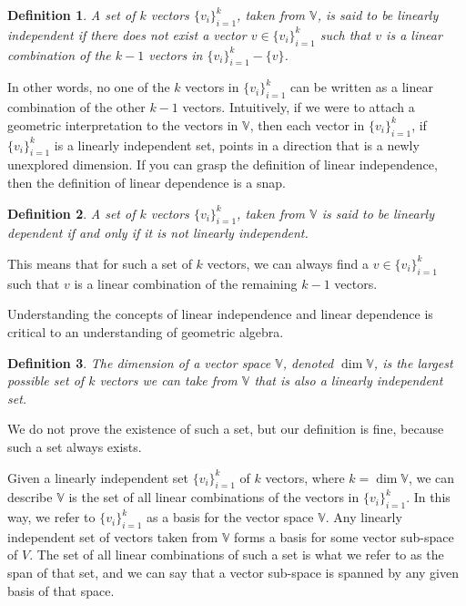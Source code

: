 \documentclass[12pt]{article}
\newcommand{\V}{\mathbb{V}}
\newtheorem{definition}{Definition}[section]
\begin{document}
\begin{definition}
A set of $k$ vectors $\{v_i\}_{i=1}^k$, taken from $\V$, is said to be linearly
independent if there does not exist a vector $v\in\{v_i\}_{i=1}^k$ such that
$v$ is a linear combination of the $k-1$ vectors in $\{v_i\}_{i=1}^k-\{v\}$.
\end{definition}

In other words, no one of the $k$ vectors in $\{v_i\}_{i=1}^k$ can be
written as a linear combination of the other $k-1$ vectors.  Intuitively, if
we were to attach a geometric interpretation to the vectors in $\V$, then
each vector in $\{v_i\}_{i=1}^k$, if $\{v_i\}_{i=1}^k$ is a linearly independent set, points
in a direction that is a newly unexplored dimension.  If you can grasp the
definition of linear independence, then the definition of linear dependence
is a snap.

\begin{definition}
A set of $k$ vectors $\{v_i\}_{i=1}^k$, taken from $\V$ is said to be linearly
dependent if and only if it is not linearly independent.
\end{definition}

This means that for such a set of $k$ vectors, we can always find a $v\in\{v_i\}_{i=1}^k$
such that $v$ is a linear combination of the remaining $k-1$ vectors.

Understanding the concepts of linear independence and linear dependence is
critical to an understanding of geometric algebra.

\begin{definition}
The dimension of a vector space $\V$, denoted $\dim\V$, is the largest
possible set of $k$ vectors we can take from $\V$ that is also a linearly
independent set.
\end{definition}

We do not prove the existence of such a set, but our definition is fine,
because such a set always exists.

Given a linearly independent set $\{v_i\}_{i=1}^k$ of $k$ vectors, where $k=\dim\V$,
we can describe $\V$ is the set of all linear combinations of the vectors in $\{v_i\}_{i=1}^k$.
In this way, we refer to $\{v_i\}_{i=1}^k$ as a basis for the vector space $\V$.
Any linearly independent set of vectors taken from $\V$ forms a basis for some
vector sub-space of $V$.  The set of all linear combinations of such a set is
what we refer to as the span of that set, and we can say that a vector sub-space
is spanned by any given basis of that space.
\end{document}
